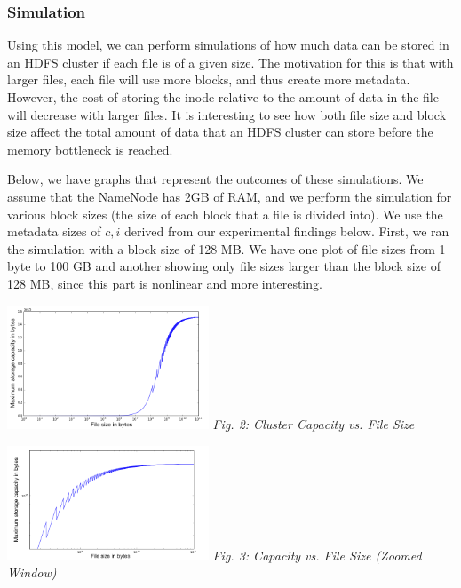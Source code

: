 \documentclass[11pt, a4paper]{article}
\begin{document}
\begin{multicols*}{2}
\subsubsection{Simulation}

Using this model, we can perform simulations of how much data can be stored in an HDFS cluster if each file is of a given size. The motivation for this is that with larger files, each file will use more blocks, and thus create more metadata. However, the cost of storing the inode relative to the amount of data in the file will decrease with larger files. It is interesting to see how both file size and block size affect the total amount of data that an HDFS cluster can store before the memory bottleneck is reached.
	
Below, we have graphs that represent the outcomes of these simulations. We assume that the NameNode has 2GB of RAM, and we perform the simulation for various block sizes (the size of each block that a file is divided into). We use the metadata sizes of $c, i$ derived from our experimental findings below. First, we ran the simulation with a block size of 128 MB. We have one plot of file sizes from 1 byte to 100 GB and another showing only file sizes larger than the block size of 128 MB, since this part is nonlinear and more interesting. 
\begin{center}
	\includegraphics[keepaspectratio=true, width=0.45\textwidth]{logScale}
	\textit{Fig. 2: Cluster Capacity vs. File Size}
\end{center}

\begin{center}
	\includegraphics[keepaspectratio=true, width=0.45\textwidth]{logLogScale}
	\textit{Fig. 3: Capacity vs. File Size (Zoomed Window)}	
\end{center}


\end{multicols*}
\end{document}
